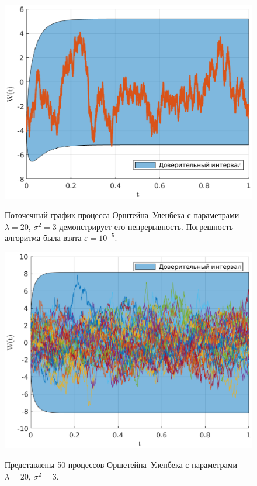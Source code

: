 \clearpage
\begin{figure}[t]
        \noindent
        \centering
        {
                \includegraphics[width=120mm]{task_09/ou-l-20-s3.eps}
        }
        \caption{Поточечный график процесса Орштейна--Уленбека с параметрами $\lambda = 20$, $\sigma^2 = 3$ демонстрирует его непрерывность. Погрешность алгоритма была взята $\varepsilon = 10^{-5}$.}
\end{figure}
\begin{figure}[b]
        \noindent
        \centering
        {
                \includegraphics[width=120mm]{task_09/50-ou.eps}
        }
        \caption{Представлены 50 процессов Оршетейна--Уленбека с параметрами $\lambda = 20$, $\sigma^2 = 3$.}
\end{figure}